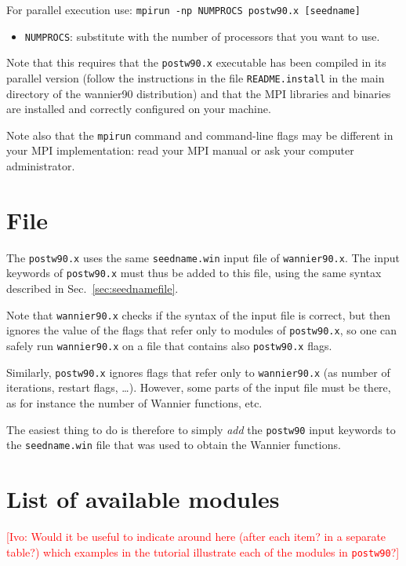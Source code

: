 For parallel execution use: {\tt mpirun -np NUMPROCS postw90.x [seedname]}

\begin{itemize} \item 
{\tt NUMPROCS}: substitute with the number of processors that you want
to use.
\end{itemize}

Note that this requires that the {\tt postw90.x} executable has been
compiled in its parallel version (follow the instructions in the file
{\tt README.install} in the main directory of the wannier90
distribution) and
that the MPI libraries and binaries are installed and correctly
configured on your machine.

Note also that the {\tt mpirun} command and command-line flags may be
different in your MPI implementation: read your MPI manual or ask your
computer administrator.


\section{ File}
The \texttt{postw90.x} uses the same \texttt{seedname.win} input file
of \texttt{wannier90.x}. The input keywords of \texttt{postw90.x} must
thus be added to this file, using the same syntax described in
Sec.~\ref{sec:seednamefile}. 

Note that \texttt{wannier90.x} checks if the syntax of the input file
is correct, but then ignores the value of the flags that refer only to
modules of \texttt{postw90.x}, so one can safely run
\texttt{wannier90.x} on a file that contains also \texttt{postw90.x}
flags.

Similarly, \texttt{postw90.x} ignores flags that refer only to
\texttt{wannier90.x} (as number of iterations, restart flags,
\ldots). However, some parts of the input file must be there, as for
instance the number of Wannier functions, etc.

The easiest thing to do
is therefore to simply \emph{add} the \texttt{postw90} input keywords to
the \texttt{seedname.win} file that was used
to obtain the Wannier functions.

\section{List of available modules}

\textcolor{red}{[Ivo: Would it be useful to indicate around here
  (after each item? in a separate table?) which examples in the
  tutorial illustrate each of the modules in {\tt postw90}?]}

